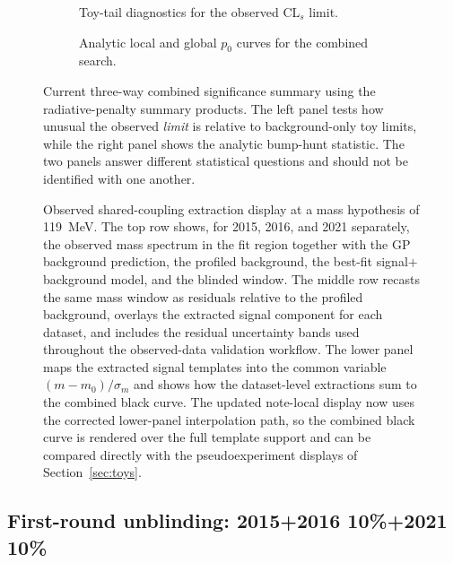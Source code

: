 \begin{figure}[H]
\centering
\begin{subfigure}[t]{0.48\linewidth}
  \centering
  \caption{Toy-tail diagnostics for the observed CL$_s$ limit.}
\end{subfigure}
\hfill
\begin{subfigure}[t]{0.48\linewidth}
  \centering
  \caption{Analytic local and global $p_0$ curves for the combined search.}
\end{subfigure}
\caption{Current three-way combined significance summary using the radiative-penalty
summary products. The left panel tests how unusual the observed
\emph{limit} is relative to background-only toy limits, while the right panel shows the
analytic bump-hunt statistic. The two panels answer different statistical questions and
should not be identified with one another.}
\label{fig:results-combined-151621-1pct-significance}
\end{figure}

\begin{figure}[p]
\centering
{}
\caption{Observed shared-coupling extraction display at a mass hypothesis of
\SI{119}{MeV}. The top row shows, for 2015, 2016, and 2021 separately, the observed
mass spectrum in the fit region together with the GP background prediction, the
profiled background, the best-fit signal$+$background model, and the blinded window.
The middle row recasts the same mass window as residuals relative to the profiled
background, overlays the extracted signal component for each dataset, and includes the
residual uncertainty bands used throughout the observed-data validation workflow. The
lower panel maps the extracted signal templates into the common variable
$(m-m_0)/\sigma_m$ and shows how the dataset-level extractions sum to the combined
black curve. The updated note-local display now uses the corrected lower-panel
interpolation path, so the combined black curve is rendered over the full template
support and can be compared directly with the pseudoexperiment displays of
Section~\ref{sec:toys}.}
\label{fig:results-combined-151621-1pct-display}
\end{figure}

\subsection{First-round unblinding: 2015+2016 10\%+2021 10\%}
\label{sec:results-first-unblinding}

